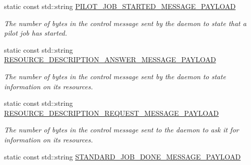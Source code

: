 \begin{DoxyCompactItemize}
\mbox{\label{classwrench_1_1_compute_service_message_payload_a0a91a957ed0eeba0bb35daea55b25fa5}} 
static const std\+::string \hyperlink{classwrench_1_1_compute_service_message_payload_a0a91a957ed0eeba0bb35daea55b25fa5}{P\+I\+L\+O\+T\+\_\+\+J\+O\+B\+\_\+\+S\+T\+A\+R\+T\+E\+D\+\_\+\+M\+E\+S\+S\+A\+G\+E\+\_\+\+P\+A\+Y\+L\+O\+AD}
\begin{DoxyCompactList}\small\item\em The number of bytes in the control message sent by the daemon to state that a pilot job has started. \end{DoxyCompactList}\item 
\mbox{\label{classwrench_1_1_compute_service_message_payload_a110f501ef6361a70627833e8ab5ab511}} 
static const std\+::string \hyperlink{classwrench_1_1_compute_service_message_payload_a110f501ef6361a70627833e8ab5ab511}{R\+E\+S\+O\+U\+R\+C\+E\+\_\+\+D\+E\+S\+C\+R\+I\+P\+T\+I\+O\+N\+\_\+\+A\+N\+S\+W\+E\+R\+\_\+\+M\+E\+S\+S\+A\+G\+E\+\_\+\+P\+A\+Y\+L\+O\+AD}
\begin{DoxyCompactList}\small\item\em The number of bytes in the control message sent by the daemon to state information on its resources. \end{DoxyCompactList}\item 
\mbox{\label{classwrench_1_1_compute_service_message_payload_abfd5cdb62efb21fb3ebf7764b9c7ad47}} 
static const std\+::string \hyperlink{classwrench_1_1_compute_service_message_payload_abfd5cdb62efb21fb3ebf7764b9c7ad47}{R\+E\+S\+O\+U\+R\+C\+E\+\_\+\+D\+E\+S\+C\+R\+I\+P\+T\+I\+O\+N\+\_\+\+R\+E\+Q\+U\+E\+S\+T\+\_\+\+M\+E\+S\+S\+A\+G\+E\+\_\+\+P\+A\+Y\+L\+O\+AD}
\begin{DoxyCompactList}\small\item\em The number of bytes in the control message sent to the daemon to ask it for information on its resources. \end{DoxyCompactList}\item 
\mbox{\label{classwrench_1_1_compute_service_message_payload_a3ba0560d8901349f0fbd2ab7e6eb3862}} 
static const std\+::string \hyperlink{classwrench_1_1_compute_service_message_payload_a3ba0560d8901349f0fbd2ab7e6eb3862}{S\+T\+A\+N\+D\+A\+R\+D\+\_\+\+J\+O\+B\+\_\+\+D\+O\+N\+E\+\_\+\+M\+E\+S\+S\+A\+G\+E\+\_\+\+P\+A\+Y\+L\+O\+AD}

\end{DoxyCompactItemize}
